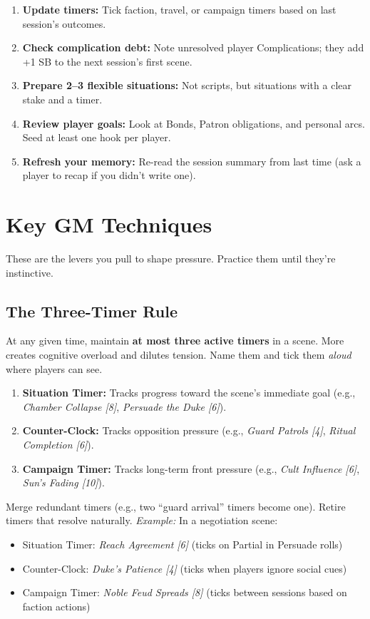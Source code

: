 \begin{tcolorbox}[colback=green!5!white, colframe=green!75!black, title=Between-Session Checklist,breakable]
  \begin{enumerate}
    \item \textbf{Update timers:} Tick faction, travel, or campaign timers based on last session's outcomes.
    \item \textbf{Check complication debt:} Note unresolved player Complications; they add +1 SB to the next session's first scene.
    \item \textbf{Prepare 2--3 flexible situations:} Not scripts, but situations with a clear stake and a timer.
    \item \textbf{Review player goals:} Look at Bonds, Patron obligations, and personal arcs. Seed at least one hook per player.
    \item \textbf{Refresh your memory:} Re-read the session summary from last time (ask a player to recap if you didn't write one).
  \end{enumerate}
\end{tcolorbox}

\section{Key GM Techniques}
These are the levers you pull to shape pressure. Practice them until they're instinctive.

\subsection{The Three-Timer Rule}
\label{sec:three-timer}
At any given time, maintain \textbf{at most three active timers} in a scene. More creates cognitive overload and dilutes tension. Name them and tick them \textit{aloud} where players can see.

\begin{enumerate}
  \item \textbf{Situation Timer:} Tracks progress toward the scene's immediate goal (e.g., \emph{Chamber Collapse [8]}, \emph{Persuade the Duke [6]}).
  \item \textbf{Counter-Clock:} Tracks opposition pressure (e.g., \emph{Guard Patrols [4]}, \emph{Ritual Completion [6]}).
  \item \textbf{Campaign Timer:} Tracks long-term front pressure (e.g., \emph{Cult Influence [6]}, \emph{Sun's Fading [10]}).
\end{enumerate}
Merge redundant timers (e.g., two ``guard arrival'' timers become one). Retire timers that resolve naturally. \textit{Example:} In a negotiation scene:
\begin{itemize}
  \item Situation Timer: \emph{Reach Agreement [6]} (ticks on Partial in Persuade rolls)
  \item Counter-Clock: \emph{Duke's Patience [4]} (ticks when players ignore social cues)
  \item Campaign Timer: \emph{Noble Feud Spreads [8]} (ticks between sessions based on faction actions)
\end{itemize}

